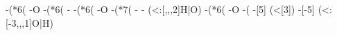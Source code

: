 \begin{struct}
{                                                                                                                                        -(*6(
                                                                                                                                            -O
                                                                                                                                            -(*6(
                                                                                                                                                -
                                                                                                                                                -(*6(
                                                                                                                                                    -O
                                                                                                                                                    -(*7(
                                                                                                                                                        -
                                                                                                                                                        -
                                                                                                                                                            (<:[,,,2]H|O)
                                                                                                                                                        -(*6(
                                                                                                                                                            -O
                                                                                                                                                            -(
                                                                                                                                                                -[5]
                                                                                                                                                                    (<[3])
                                                                                                                                                                -[-5]
                                                                                                                                                                    (<:[-3,,,1]O|H)
}
\end{struct}
